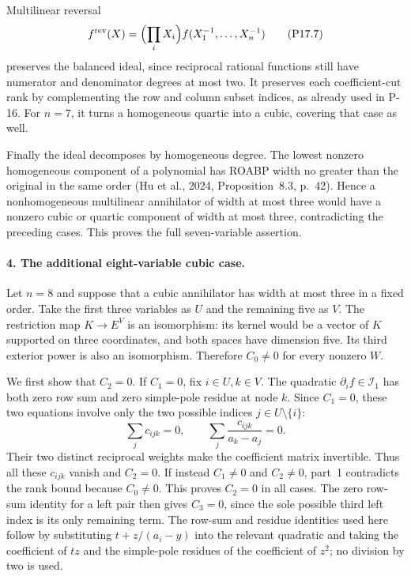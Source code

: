 Multilinear reversal
\[
 f^{\mathrm{rev}}(X)=\Bigl(\prod_iX_i\Bigr)f(X_1^{-1},\ldots,X_n^{-1})
 \tag{P17.7}
\]
preserves the balanced ideal, since reciprocal rational functions
still have numerator and denominator degrees at most two.
It preserves each coefficient-cut rank by complementing the
row and column subset indices, as already used in P-16. For
$n=7$, it turns a homogeneous quartic into a cubic, covering
that case as well.

Finally the ideal decomposes by homogeneous degree. The lowest
nonzero homogeneous component of a polynomial has ROABP width
no greater than the original in the same order (Hu et al., 2024,
Proposition~8.3, p.~42). Hence a nonhomogeneous multilinear
annihilator of width at most three would have a nonzero cubic
or quartic component of width at most three, contradicting the
preceding cases. This proves the full seven-variable assertion.

\paragraph{4. The additional eight-variable cubic case.}
Let $n=8$ and suppose that a cubic annihilator has width at most
three in a fixed order. Take the first three variables as $U$
and the remaining five as $V$. The restriction map
$K\to E^V$ is an isomorphism: its kernel would be a vector of
$K$ supported on three coordinates, and both spaces have
dimension five. Its third exterior power is also an
isomorphism. Therefore $C_0\ne0$ for every nonzero $W$.

We first show that $C_2=0$. If $C_1=0$, fix $i\in U,k\in V$.
The quadratic $\partial_i f\in\mathcal I_1$ has both zero row
sum and zero simple-pole residue at node $k$. Since $C_1=0$,
these two equations involve only the two possible indices
$j\in U\setminus\{i\}$:
\[
 \sum_j c_{ijk}=0,\qquad
 \sum_j\frac{c_{ijk}}{a_k-a_j}=0.
 \tag{P17.8}
\]
Their two distinct reciprocal weights make the coefficient
matrix invertible. Thus all these $c_{ijk}$ vanish and $C_2=0$.
If instead $C_1\ne0$ and $C_2\ne0$, part~1 contradicts the
rank bound because $C_0\ne0$. This proves $C_2=0$ in all cases.
The zero row-sum identity for a left pair then gives $C_3=0$,
since the sole possible third left index is its only remaining
term. The row-sum and residue identities used here follow
by substituting $t+z/(a_i-y)$ into the relevant quadratic
and taking the coefficient of $tz$ and the simple-pole
residues of the coefficient of $z^2$; no division by two is
used.

